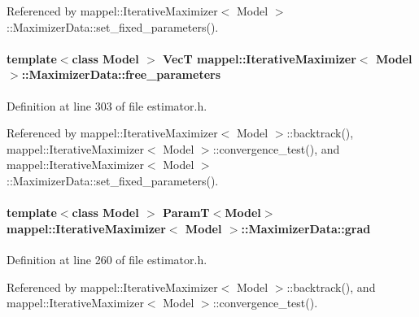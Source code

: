 Referenced by mappel\+::\+Iterative\+Maximizer$<$ Model $>$\+::\+Maximizer\+Data\+::set\+\_\+fixed\+\_\+parameters().

\paragraph[{\texorpdfstring{free\+\_\+parameters}{free_parameters}}]{\setlength{\rightskip}{0pt plus 5cm}template$<$class Model $>$ {\bf VecT} {\bf mappel\+::\+Iterative\+Maximizer}$<$ Model $>$\+::Maximizer\+Data\+::free\+\_\+parameters}\hypertarget{classmappel_1_1IterativeMaximizer_1_1MaximizerData_a840b35e492c842d50244736971d7bb9e}{}\label{classmappel_1_1IterativeMaximizer_1_1MaximizerData_a840b35e492c842d50244736971d7bb9e}


Definition at line 303 of file estimator.\+h.



Referenced by mappel\+::\+Iterative\+Maximizer$<$ Model $>$\+::backtrack(), mappel\+::\+Iterative\+Maximizer$<$ Model $>$\+::convergence\+\_\+test(), and mappel\+::\+Iterative\+Maximizer$<$ Model $>$\+::\+Maximizer\+Data\+::set\+\_\+fixed\+\_\+parameters().

\paragraph[{\texorpdfstring{grad}{grad}}]{\setlength{\rightskip}{0pt plus 5cm}template$<$class Model $>$ {\bf ParamT}$<$Model$>$ {\bf mappel\+::\+Iterative\+Maximizer}$<$ Model $>$\+::Maximizer\+Data\+::grad}\hypertarget{classmappel_1_1IterativeMaximizer_1_1MaximizerData_a3125e5d8ae4e2d4c4969ccb0187903fb}{}\label{classmappel_1_1IterativeMaximizer_1_1MaximizerData_a3125e5d8ae4e2d4c4969ccb0187903fb}


Definition at line 260 of file estimator.\+h.



Referenced by mappel\+::\+Iterative\+Maximizer$<$ Model $>$\+::backtrack(), and mappel\+::\+Iterative\+Maximizer$<$ Model $>$\+::convergence\+\_\+test().

